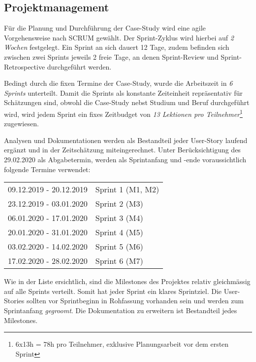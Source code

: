 \subsection{Projektmanagement}
Für die Planung und Durchführung der Case-Study wird eine agile Vorgehensweise nach SCRUM gewählt. Der Sprint-Zyklus wird hierbei auf \emph{2 Wochen} festgelegt. Ein Sprint an sich dauert 12 Tage, zudem befinden sich zwischen zwei Sprints jeweils 2 freie Tage, an denen Sprint-Review und Sprint-Retrospective durchgeführt werden.

Bedingt durch die fixen Termine der Case-Study, wurde die Arbeitszeit in \emph{6 Sprints} unterteilt. Damit die Sprints als konstante Zeiteinheit repräsentativ für Schätzungen sind, obwohl die Case-Study nebst Studium und Beruf durchgeführt wird, wird jedem Sprint ein fixes Zeitbudget von \emph{13 Lektionen pro Teilnehmer}\footnote{6x13h = 78h pro Teilnehmer, exklusive Planungsarbeit vor dem ersten Sprint} zugewiesen.

Analysen und Dokumentationen werden als Bestandteil jeder User-Story laufend ergänzt und in der Zeitschätzung miteingerechnet. Unter Berücksichtigung des 29.02.2020 als Abgabetermin, werden als Sprintanfang und -ende voraussichtlich folgende Termine verwendet:

\begin{center}
  \begin{tabular}{ l l } 
    09.12.2019 - 20.12.2019 & Sprint 1 (M1, M2) \\ 
    23.12.2019 - 03.01.2020 & Sprint 2 (M3) \\ 
    06.01.2020 - 17.01.2020 & Sprint 3 (M4) \\ 
    20.01.2020 - 31.01.2020 & Sprint 4 (M5) \\
    03.02.2020 - 14.02.2020 & Sprint 5 (M6) \\
    17.02.2020 - 28.02.2020 & Sprint 6 (M7) \\ 
  \end{tabular}
\end{center}

\noindent
Wie in der Liste ersichtlich, sind die Milestones des Projektes relativ gleichmässig auf alle Sprints verteilt. Somit hat jeder Sprint ein klares Sprintziel. Die User-Stories sollten vor Sprintbeginn in Rohfassung vorhanden sein und werden zum Sprintanfang \emph{gegroomt}. Die Dokumentation zu erweitern ist Bestandteil jedes Milestones.
